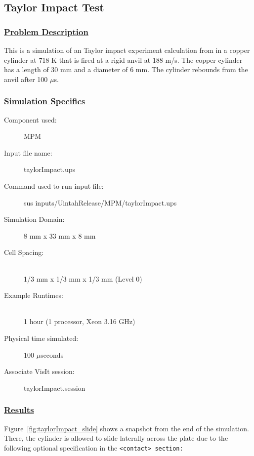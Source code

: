 \subsection*{\center Taylor Impact Test}
\subsubsection*{\underline{Problem Description}}
This is a simulation of an Taylor impact experiment calculation from 
\cite{Gust82} in a copper cylinder at 718 K that is fired at a
rigid anvil at 188 m/s.  The copper cylinder has a length of 30 mm and
a diameter of 6 mm.  The cylinder rebounds from the anvil after 100 $\mu$s.
 
\subsubsection*{\underline{Simulation Specifics}}
\begin{description} 
\item [Component used:] \hfill MPM
\item [Input file name:] \hfill taylorImpact.ups
\item [Command used to run input file:]\hfill sus inputs/UintahRelease/MPM/taylorImpact.ups
\item [Simulation Domain:]\hfill 8 mm x 33 mm x 8 mm

\item [Cell Spacing:]\hfill \\ 
  1/3 mm x 1/3 mm x 1/3 mm (Level 0)

\item [Example Runtimes:] \hfill \\
  1 hour   (1 processor, Xeon 3.16 GHz)\\

\item [Physical time simulated:] \hfill 100 $\mu$seconds

\item [Associate VisIt session:] \hfill taylorImpact.session

\end{description}

\subsubsection*{\underline{Results}}
Figure~\ref{fig:taylorImpact_slide} shows a snapshot from the end of the simulation.
There, the cylinder is allowed to slide laterally across the plate due
to the following optional specification in the \tt <contact> \normalfont
section:

